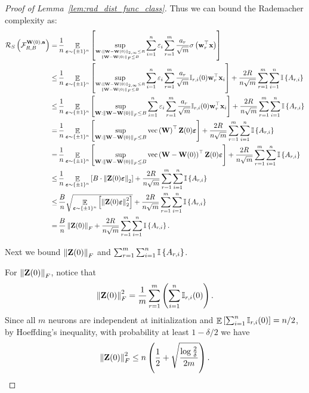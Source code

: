 \begin{proof}[Proof of Lemma~\ref{lem:rad_dist_func_class}]
Thus we can bound the Rademacher complexity as:
\begin{align*}
\mathcal{R}_S\left( \mathcal{F}^{\mathbf{W}(0),\mathbf{a}}_{R,B} \right)
=\,& \frac1n \mathop\mathbb{E}_{{\bm{\varepsilon}} \sim \{\pm 1\}^n }\left[  \sup_{\tiny \substack{\mathbf{W}: \left\|\mathbf{W}-\mathbf{W}(0)\right\|_{2,\infty}\le R \\ \left\|\mathbf{W}-\mathbf{W}(0)\right\|_F\le B }}  \sum_{i=1}^n\varepsilon_i \sum_{r=1}^m\frac{ a_r}{\sqrt{m}} \sigma\left(\mathbf{w}_r^\top \mathbf{x}\right)  \right]\\
\le\, & \frac1n  \mathop\mathbb{E}_{{\bm{\varepsilon}} \sim \{\pm 1\}^n }\left[  \sup_{\tiny \substack{\mathbf{W}: \left\|\mathbf{W}-\mathbf{W}(0)\right\|_{2,\infty}\le R \\ \left\|\mathbf{W}-\mathbf{W}(0)\right\|_F\le B }}  \sum_{i=1}^n\varepsilon_i  \sum_{r=1}^m\frac{ a_r}{\sqrt{m}} \mathbb{I}_{r,i}(0) \mathbf{w}_r^\top \mathbf{x}_i    \right] + \frac{2R}{n\sqrt{m}}\sum_{r=1}^m \sum_{i=1}^n  \mathbb{I}\left\{A_{r, i}\right\}  \\
\le\, & \frac1n  \mathop\mathbb{E}_{{\bm{\varepsilon}} \sim \{\pm 1\}^n }\left[  \sup_{\mathbf{W}: \left\|\mathbf{W}-\mathbf{W}(0)\right\|_F\le B}  \sum_{i=1}^n\varepsilon_i   \sum_{r=1}^m\frac{ a_r}{\sqrt{m}} \mathbb{I}_{r,i}(0) \mathbf{w}_r^\top \mathbf{x}_i   \right] + \frac{2R}{n\sqrt{m}}\sum_{r=1}^m \sum_{i=1}^n  \mathbb{I}\left\{A_{r, i}\right\}  \\
=\, & \frac1n  \mathop\mathbb{E}_{{\bm{\varepsilon}} \sim \{\pm 1\}^n }\left[  \sup_{\mathbf{W}: \left\|\mathbf{W}-\mathbf{W}(0)\right\|_F\le B}  \text{vec}\left(\mathbf{W}\right)^\top \mathbf{Z}(0) {\bm{\varepsilon}}  \right]+ \frac{2R}{n\sqrt{m}}\sum_{r=1}^m \sum_{i=1}^n  \mathbb{I}\left\{A_{r, i}\right\}  \\
=\, & \frac1n  \mathop\mathbb{E}_{{\bm{\varepsilon}} \sim \{\pm 1\}^n }\left[  \sup_{\mathbf{W}: \left\|\mathbf{W}-\mathbf{W}(0)\right\|_F\le B}  \text{vec}\left(\mathbf{W} - \mathbf{W}(0)\right)^\top \mathbf{Z}(0) {\bm{\varepsilon}}  \right] + \frac{2R}{n\sqrt{m}}\sum_{r=1}^m \sum_{i=1}^n  \mathbb{I}\left\{A_{r, i}\right\}  \\
\le\,& \frac1n \mathop\mathbb{E}_{{\bm{\varepsilon}} \sim \{\pm 1\}^n }\left[ B\cdot \left\|\mathbf{Z}(0) \bm{\varepsilon}\right\|_2 \right] + \frac{2R}{n\sqrt{m}}\sum_{r=1}^m \sum_{i=1}^n  \mathbb{I}\left\{A_{r, i}\right\}  \\
\le\,& \frac Bn \sqrt{\mathop\mathbb{E}_{{\bm{\varepsilon}} \sim \{\pm 1\}^n }\left[  \left\|\mathbf{Z}(0) \bm{\varepsilon}\right\|_2^2 \right]} + \frac{2R}{n\sqrt{m}}\sum_{r=1}^m \sum_{i=1}^n  \mathbb{I}\left\{A_{r, i}\right\}  \\
=\, & \frac Bn \left\|\mathbf{Z}(0)\right\|_F + \frac{2R}{n\sqrt{m}} \sum_{r=1}^m \sum_{i=1}^n  \mathbb{I}\left\{A_{r, i}\right\} .
\end{align*}

Next we bound $\left\|\mathbf{Z}(0)\right\|_F$ and $\sum_{r=1}^m \sum_{i=1}^n  \mathbb{I}\left\{A_{r, i}\right\}$.

For $\left\|\mathbf{Z}(0)\right\|_F$, notice that
\begin{align*}
\left\|\mathbf{Z}(0)\right\|_F^2 = \frac1m \sum_{r=1}^m \left( \sum_{i=1}^n \mathbb{I}_{r,i}(0) \right).
\end{align*}
Since all $m$ neurons are independent at initialization and $\mathop\mathbb{E}\left[ \sum_{i=1}^n \mathbb{I}_{r,i}(0) \right] = n/2$, by Hoeffding's inequality, with probability at least $1-\delta/2$ we have
 \begin{align*}
 \left\|\mathbf{Z}(0)\right\|_F^2 \le n\left( \frac 12 + \sqrt{\frac{\log \frac2\delta}{2m}} \right).
 \end{align*}


\end{proof}
